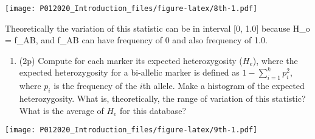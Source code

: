 \documentclass[
]{article}
\newenvironment{Shaded}{\begin{snugshade}}{\end{snugshade}}
\newcommand{\CommentTok}[1]{\textcolor[rgb]{0.56,0.35,0.01}{\textit{#1}}}
\newcommand{\ControlFlowTok}[1]{\textcolor[rgb]{0.13,0.29,0.53}{\textbf{#1}}}
\newcommand{\DataTypeTok}[1]{\textcolor[rgb]{0.13,0.29,0.53}{#1}}
\newcommand{\DecValTok}[1]{\textcolor[rgb]{0.00,0.00,0.81}{#1}}
\newcommand{\FloatTok}[1]{\textcolor[rgb]{0.00,0.00,0.81}{#1}}
\newcommand{\KeywordTok}[1]{\textcolor[rgb]{0.13,0.29,0.53}{\textbf{#1}}}
\newcommand{\NormalTok}[1]{#1}
\newcommand{\OperatorTok}[1]{\textcolor[rgb]{0.81,0.36,0.00}{\textbf{#1}}}
\newcommand{\StringTok}[1]{\textcolor[rgb]{0.31,0.60,0.02}{#1}}
\providecommand{\tightlist}{%
  \setlength{\itemsep}{0pt}\setlength{\parskip}{0pt}}
\begin{document}
\texttt{[image: P012020\_Introduction\_files/figure-latex/8th-1.pdf]}

Theoretically the variation of this statistic can be in interval {[}0,
1.0{]} because H\_o = f\_AB, and f\_AB can have frequency of 0 and also
frequency of 1.0.

\begin{enumerate}
\def\labelenumi{\arabic{enumi}.}
\setcounter{enumi}{8}
\tightlist
\item
  (2p) Compute for each marker its expected heterozygosity (\(H_e\)),
  where the expected heterozygosity for a bi-allelic marker is defined
  as \(1 - \sum_{i=1}^k p_i^2\), where \(p_i\) is the frequency of the
  \(i\)th allele. Make a histogram of the expected heterozygosity. What
  is, theoretically, the range of variation of this statistic? What is
  the average of \(H_e\) for this database?
\end{enumerate}

\begin{Shaded}
\end{Shaded}

\texttt{[image: P012020\_Introduction\_files/figure-latex/9th-1.pdf]}
\end{document}
